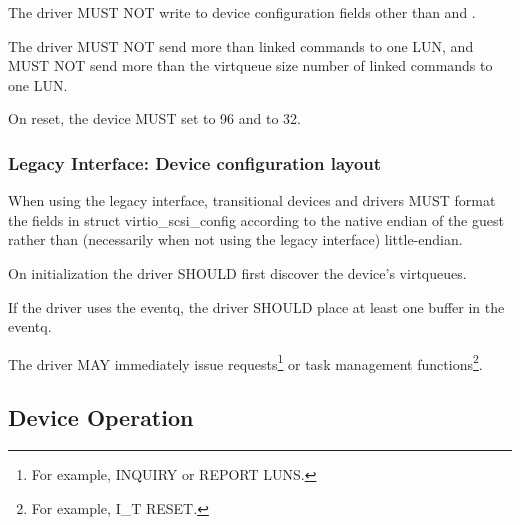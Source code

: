 
The driver MUST NOT write to device configuration fields other than
 and .

The driver MUST NOT send more than  linked commands
to one LUN, and MUST NOT send more than the virtqueue size number of
linked commands to one LUN.


On reset, the device MUST set  to 96 and
 to 32.

\subsubsection{Legacy Interface: Device configuration layout}\label{sec:Device Types / SCSI Host Device / Device configuration layout / Legacy Interface: Device configuration layout}
When using the legacy interface, transitional devices and drivers
MUST format the fields in struct virtio_scsi_config
according to the native endian of the guest rather than
(necessarily when not using the legacy interface) little-endian.


On initialization the driver SHOULD first discover the
device's virtqueues.

If the driver uses the eventq, the driver SHOULD place at least one
buffer in the eventq.

The driver MAY immediately issue requests\footnote{For example, INQUIRY
or REPORT LUNS.} or task management functions\footnote{For example, I_T
RESET.}.

\subsection{Device Operation}\label{sec:Device Types / SCSI Host Device / Device Operation}

